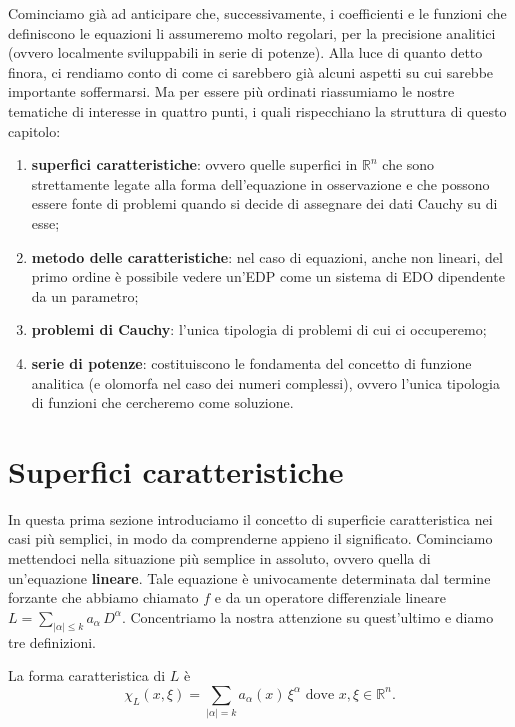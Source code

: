Cominciamo già ad anticipare che, successivamente, i coefficienti e le funzioni che definiscono le equazioni li assumeremo molto regolari, per la precisione analitici (ovvero localmente sviluppabili in serie di potenze).
\newpage
Alla luce di quanto detto finora, ci rendiamo conto di come ci sarebbero già alcuni aspetti su cui sarebbe importante soffermarsi.
Ma per essere più ordinati riassumiamo le nostre tematiche di interesse in quattro punti, i quali rispecchiano la struttura di questo capitolo:
\begin{enumerate}
\item \textbf{superfici caratteristiche}: ovvero quelle superfici in $\mathbb{R}^n$ che sono strettamente legate alla forma dell'equazione in osservazione e che possono essere fonte di problemi quando si decide di assegnare dei dati Cauchy su di esse;
\item \textbf{metodo delle caratteristiche}: nel caso di equazioni, anche non lineari, del primo ordine è possibile vedere un'EDP come un sistema di EDO dipendente da un parametro;
\item \textbf{problemi di Cauchy}: l'unica tipologia di problemi di cui ci occuperemo;
\item \textbf{serie di potenze}: costituiscono le fondamenta del concetto di funzione analitica (e olomorfa nel caso dei numeri complessi), ovvero l'unica tipologia di funzioni che cercheremo come soluzione. 
\end{enumerate}


\section{Superfici caratteristiche} \label{supcar}
In questa prima sezione introduciamo il concetto di superficie caratteristica nei casi più semplici, in modo da comprenderne appieno il significato. Cominciamo mettendoci nella situazione più semplice in assoluto, ovvero quella di un'equazione \textbf{lineare}. 
Tale equazione è univocamente determinata dal termine forzante che abbiamo chiamato $f$ e da un operatore differenziale lineare $L=\sum_{|\alpha |\leq k} a_\alpha \, D^\alpha$. Concentriamo la nostra attenzione su quest'ultimo e diamo tre definizioni.

\begin{definition}
La forma caratteristica di $L$ è 
$$\chi_L(x,\xi)=\sum_{|\alpha |= k} a_\alpha(x) \, \xi^\alpha \text{ dove }  {x,\xi \in \mathbb{R}^n}.$$
\end{definition}

